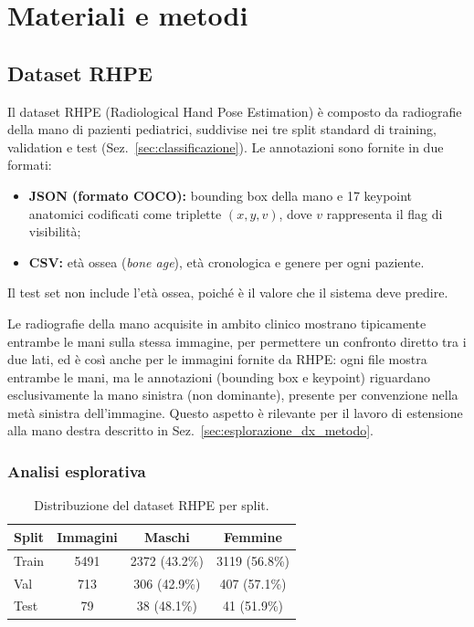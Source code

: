 \chapter{Materiali e metodi}
\label{chap:materiali_metodi}

\section{Dataset RHPE}
\label{sec:dataset}

Il dataset RHPE (Radiological Hand Pose Estimation) è composto da radiografie
della mano di pazienti pediatrici, suddivise nei tre split standard di
training, validation e test (Sez.~\ref{sec:classificazione}). Le
annotazioni sono fornite in due formati:

\begin{itemize}
    \item \textbf{JSON (formato COCO):} bounding box della mano e 17
    keypoint anatomici codificati come triplette $(x, y, v)$, dove $v$
    rappresenta il flag di visibilità;
    \item \textbf{CSV:} età ossea (\emph{bone age}), età cronologica e
    genere per ogni paziente.
\end{itemize}

Il test set non include l'età ossea, poiché è il valore che il sistema deve
predire.

Le radiografie della mano acquisite in ambito clinico mostrano
tipicamente entrambe le mani sulla stessa immagine, per permettere un
confronto diretto tra i due lati, ed è così anche per le immagini
fornite da RHPE: ogni file mostra entrambe le mani, ma le annotazioni
(bounding box e keypoint) riguardano esclusivamente la mano sinistra
(non dominante), presente per convenzione nella metà sinistra
dell'immagine. Questo aspetto è rilevante per il lavoro di estensione
alla mano destra descritto in Sez.~\ref{sec:esplorazione_dx_metodo}.

\subsection{Analisi esplorativa}
\label{sec:eda}

\begin{table}[H]
\centering
\caption{Distribuzione del dataset RHPE per split.}
\label{tab:dataset_split}
\smallskip
\begin{tabular}{lccc}
\toprule
Split & Immagini & Maschi & Femmine \\
\midrule
Train & 5491 & 2372 (43.2\%) & 3119 (56.8\%) \\
Val   & 713  & 306 (42.9\%)  & 407 (57.1\%)  \\
Test  & 79   & 38 (48.1\%)   & 41 (51.9\%)   \\
\bottomrule
\end{tabular}
\end{table}

